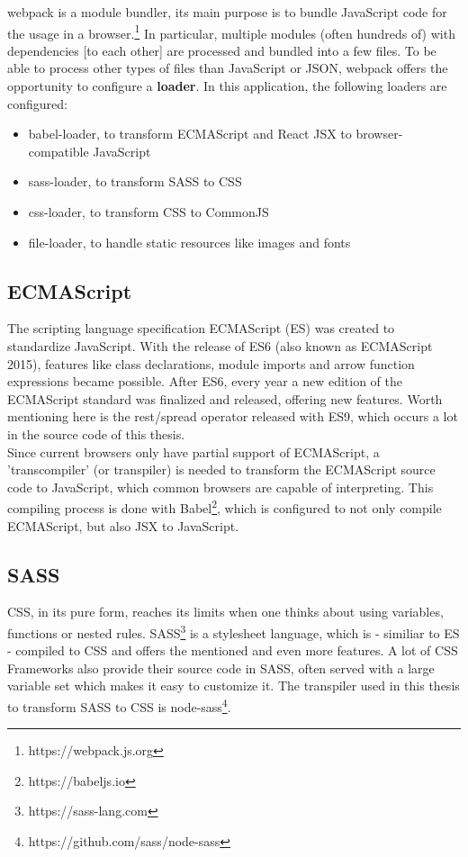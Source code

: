 \documentclass[a4paper,11pt,pdftex,halfparskip,cleardoubleempty,bibtotoc,liststotoc]{scrbook}
\begin{document}
webpack is a module bundler, its main purpose is to bundle JavaScript code for the usage in a browser.\footnote{https://webpack.js.org} In particular, multiple modules (often hundreds of) with dependencies [to each other] are processed and bundled into a few files. To be able to process other types of files than JavaScript or JSON, webpack offers the opportunity to configure a \textbf{loader}. In this application, the following loaders are configured:
\begin{itemize}
\item babel-loader, to transform ECMAScript and React JSX to browser-compatible JavaScript
\item sass-loader, to transform SASS to CSS
\item css-loader, to transform CSS to CommonJS
\item file-loader, to handle static resources like images and fonts
\end{itemize}

\subsection{ECMAScript}

The scripting language specification ECMAScript (ES) was created to standardize JavaScript. With the release of ES6 (also known as ECMAScript 2015), features like class declarations, module imports and arrow function expressions became possible. After ES6, every year a new edition of the ECMAScript standard was finalized and released, offering new features. Worth mentioning here is the rest/spread operator released with ES9, which occurs a lot in the source code of this thesis.\\
Since current browsers only have partial support of ECMAScript, a 'transcompiler' (or transpiler) is needed to transform the ECMAScript source code to JavaScript, which common browsers are capable of interpreting.
This compiling process is done with Babel\footnote{https://babeljs.io}, which is configured to not only compile ECMAScript, but also JSX to JavaScript.

\subsection{SASS}

CSS, in its pure form, reaches its limits when one thinks about using variables, functions or nested rules. SASS\footnote{https://sass-lang.com} is a stylesheet language, which is - similiar to ES - compiled to CSS and offers the mentioned and even more features.
A lot of CSS Frameworks also provide their source code in SASS, often served with a large variable set which makes it easy to customize it. The transpiler used in this thesis to transform SASS to CSS is node-sass\footnote{https://github.com/sass/node-sass}.
\end{document}
